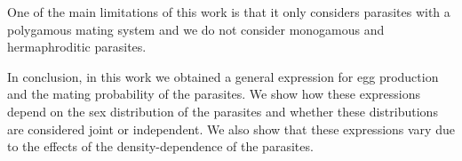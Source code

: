 \documentclass[12pt,a4paper]{article}
\theoremstyle{plain}%
\theoremstyle{definition}
\theoremstyle{remark}
\begin{document}
	
One of the main limitations of this work is that it only considers parasites with a polygamous mating system and we do not consider monogamous and hermaphroditic parasites.

In conclusion, in this work we obtained a general expression for egg production and the mating probability of the parasites. We show how these expressions depend on the sex distribution of the parasites and whether these distributions are considered joint or independent. 
We also show that these expressions vary due to the effects of the density-dependence of the parasites.
%	
%	
%	
%	
%	
%	
%	
%	
%	
%	
%
%
	
\end{document}
